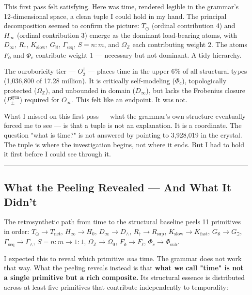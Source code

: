 \documentclass[12pt,a4paper]{article}
\begin{document}
This first pass felt satisfying. Here was time, rendered legible in the grammar's 12-dimensional space, a clean tuple I could hold in my hand. The principal decomposition seemed to confirm the picture: $T_{\odot}$ (ordinal contribution 4) and $H_{\infty}$ (ordinal contribution 3) emerge as the dominant load-bearing atoms, with $D_{\infty}$, $R_{\dagger}$, $K_\text{slow}$, $G_{\aleph}$, $\Gamma_\text{seq}$, $S = n{:}m$, and $\Omega_\mathbb{Z}$ each contributing weight 2. The atoms $F_{\eth}$ and $\Phi_c$ contribute weight 1 --- necessary but not dominant. A tidy hierarchy.

The ouroboricity tier --- $O_2^\dagger$ --- places time in the upper 6\% of all structural types (1,036,800 of 17.28 million). It is critically self-modeling ($\Phi_c$), topologically protected ($\Omega_\mathbb{Z}$), and unbounded in domain ($D_{\infty}$), but lacks the Frobenius closure ($P_{\pm}^{\text{sym}}$) required for $O_{\infty}$. This felt like an endpoint. It was not.

What I missed on this first pass --- what the grammar's own structure eventually forced me to see --- is that a tuple is not an explanation. It is a coordinate. The question "what is time?" is not answered by pointing to 3,928,019 in the crystal. The tuple is where the investigation begins, not where it ends. But I had to hold it first before I could see through it.

\begin{center}
\rule{0.5\textwidth}{0.4pt}
\end{center}

\subsection{What the Peeling Revealed --- And What It Didn't}

The retrosynthetic path from time to the structural baseline peels 11 primitives in order: $T_{\odot} \to T_\text{net}$, $H_{\infty} \to H_0$, $D_{\infty} \to D_{\wedge}$, $R_{\dagger} \to R_\text{sup}$, $K_\text{slow} \to K_\text{fast}$, $G_{\aleph} \to G_{\beth}$, $\Gamma_\text{seq} \to \Gamma_{\wedge}$, $S = n{:}m \to 1{:}1$, $\Omega_\mathbb{Z} \to \Omega_0$, $F_{\eth} \to F_{\ell}$, $\Phi_c \to \Phi_\text{sub}$.

I expected this to reveal which primitive \emph{was} time. The grammar does not work that way. What the peeling reveals instead is that \textbf{what we call "time" is not a single primitive but a rich composite.} Its structural essence is distributed across at least five primitives that contribute independently to temporality:
\end{document}
